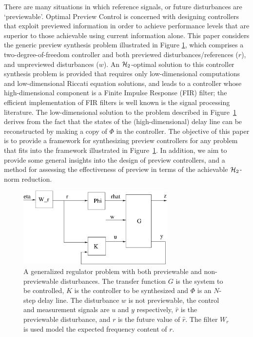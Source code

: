 \label{sec:Intro}
There are many situations in which reference signals, or future disturbances are `previewable'. 
Optimal Preview Control is concerned with designing controllers that exploit previewed information in order to achieve performance levels that are superior to those achievable using current information alone. This paper considers the generic preview synthesis problem illustrated in Figure \ref{fig:DistRejSys}, which comprises a two-degree-of-freedom controller and both previewed disturbances/references ($r$), and unpreviewed disturbances ($w$).
An $\mathcal H_2$-optimal solution to this controller synthesis problem is provided that requires only low-dimensional computations and low-dimensional Riccati equation solutions, and leads to a controller whose high-dimensional component is a Finite Impulse Response (FIR) filter; the efficient implementation of FIR filters is well known is the signal processing literature.
The low-dimensional solution to the problem described in Figure~\ref{fig:DistRejSys} derives from the fact that the states of the (high-dimensional) delay line can be reconstructed by making a copy of $\Phi$ in the controller.  The objective of this paper is to provide a framework for synthesizing preview controllers for any problem that fits into the framework illustrated in Figure~\ref{fig:DistRejSys}. In addition, we aim to provide some general insights into the design of preview controllers, and a method for assessing the effectiveness of preview in terms of the achievable $\mathcal H_2$-norm reduction.
\begin{figure}
\begin{center}
\stdcontrolfrags
{}
\includegraphics[height=4.0cm]{./diags/DistRejSys.eps}
\caption{\label{fig:DistRejSys} A generalized regulator problem with both previewable and non-previewable disturbances. The transfer function $G$ is the system to be controlled, $K$ is the controller to be synthesized and $\Phi$ is an $N$-step delay line. The disturbance $w$ is not previewable, the control and measurement signals are $u$ and $y$ respectively, $\hat r$ is the previewable disturbance, and $r$ is the future value of $\hat r$. The filter $W_r$ is used  model the expected frequency content of $r$.}
\end{center}
\end{figure}

